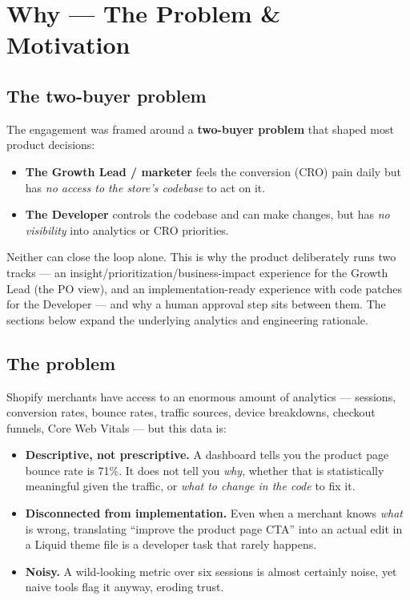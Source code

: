 \documentclass[11pt,a4paper]{article}
\begin{document}
\section{Why --- The Problem \& Motivation}

\subsection{The two-buyer problem}

The engagement was framed around a \textbf{two-buyer problem} that shaped most
product decisions:

\begin{itemize}[leftmargin=1.4em]
  \item \textbf{The Growth Lead / marketer} feels the conversion (CRO) pain
  daily but has \emph{no access to the store's codebase} to act on it.
  \item \textbf{The Developer} controls the codebase and can make changes, but
  has \emph{no visibility} into analytics or CRO priorities.
\end{itemize}

Neither can close the loop alone. This is why the product deliberately runs two
tracks --- an insight/prioritization/business-impact experience for the Growth
Lead (the PO view), and an implementation-ready experience with code patches
for the Developer --- and why a human approval step sits between them. The
sections below expand the underlying analytics and engineering rationale.

\subsection{The problem}

Shopify merchants have access to an enormous amount of analytics --- sessions,
conversion rates, bounce rates, traffic sources, device breakdowns, checkout
funnels, Core Web Vitals --- but this data is:

\begin{itemize}[leftmargin=1.4em]
  \item \textbf{Descriptive, not prescriptive.} A dashboard tells you the
  product page bounce rate is 71\%. It does not tell you \emph{why}, whether
  that is statistically meaningful given the traffic, or \emph{what to change
  in the code} to fix it.
  \item \textbf{Disconnected from implementation.} Even when a merchant knows
  \emph{what} is wrong, translating ``improve the product page CTA'' into an
  actual edit in a Liquid theme file is a developer task that rarely happens.
  \item \textbf{Noisy.} A wild-looking metric over six sessions is almost
  certainly noise, yet naive tools flag it anyway, eroding trust.
\end{itemize}
\end{document}
